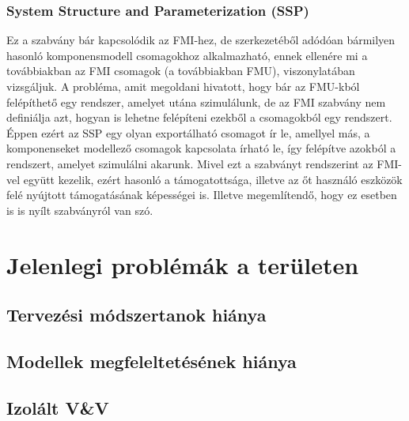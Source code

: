         \subsubsection{System Structure and Parameterization (SSP)}
        Ez a szabvány bár kapcsolódik az FMI-hez, de szerkezetéből adódóan bármilyen hasonló
        komponensmodell csomagokhoz alkalmazható, ennek ellenére mi a továbbiakban az FMI csomagok (a
        továbbiakban FMU), viszonylatában vizsgáljuk. A probléma, amit megoldani hivatott, hogy bár az
        FMU-kból felépíthető egy rendszer, amelyet utána szimulálunk, de az FMI szabvány nem definiálja
        azt, hogyan is lehetne felépíteni ezekből a csomagokból egy rendszert. Éppen ezért az SSP egy olyan
        exportálható csomagot ír le, amellyel más, a komponenseket modellező csomagok kapcsolata írható le,
        így felépítve azokból a rendszert, amelyet szimulálni akarunk. Mivel ezt a szabványt rendszerint az
        FMI-vel együtt kezelik, ezért hasonló a támogatottsága, illetve az őt használó eszközök felé nyújtott
        támogatásának képességei is. Illetve megemlítendő, hogy ez esetben is is nyílt szabványról van szó.


\section{Jelenlegi problémák a területen}

    \subsection{Tervezési módszertanok hiánya}

    \subsection{Modellek megfeleltetésének hiánya}

    \subsection{Izolált V\&V}